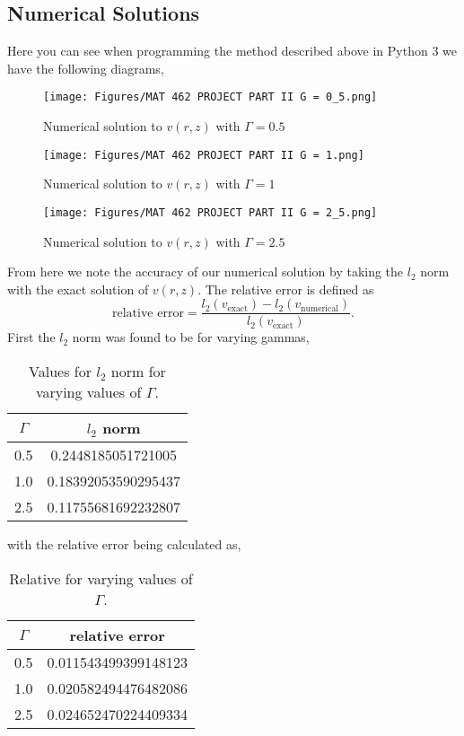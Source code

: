 \documentclass[11pt,letterpaper]{article}
\newcommand{\fpar}[1]{\left({#1}\right)} %
\begin{document}
\subsection{Numerical Solutions}
Here you can see when programming the method described above in Python 3 we have the following diagrams,
\begin{figure}[H]
  \texttt{[image: Figures/MAT 462 PROJECT PART II G = 0\_5.png]}
  \caption{Numerical solution to $v(r,z)$ with $\Gamma = 0.5 $}\label{fig:Gamma0.5}
\endminipage\hfill
{}
  \texttt{[image: Figures/MAT 462 PROJECT PART II G = 1.png]}
  \caption{Numerical solution to $v(r,z)$ with $\Gamma = 1 $}\label{fig:Gamma1}
\endminipage\hfill
{}%
  \texttt{[image: Figures/MAT 462 PROJECT PART II G = 2\_5.png]}
  \caption{Numerical solution to  $v(r,z)$ with $\Gamma = 2.5 $}\label{fig:Gamma2.5}
\endminipage
\end{figure}
From here we note the accuracy of our numerical solution by taking the $l_2$ norm with the exact solution of $v(r,z)$. The relative error is defined as
\begin{equation}\label{eq:Rel_Error}
       \text{relative error} = \dfrac{l_{2}\fpar{v_{\text{exact}}} - l_{2}\fpar{ v_{\text{numerical}}}}{l_{2}\fpar{v_{\text{exact}}}}.
\end{equation}
First the $l_2$ norm was found to be for varying gammas,
\begin{table}[H]
\centering
\begin{tabular}{|c|c|}
        \hline
        $\Gamma$ & $l_2$ norm\\
        \hline
        0.5 & 0.2448185051721005  \\
        \hline
        1.0 & 0.18392053590295437 \\
        \hline
        2.5 &  0.11755681692232807  \\
        \hline
        \end{tabular}
\caption{\label{tab:l2norm}Values for $l_2$ norm for varying values of $\Gamma$.}
\end{table}
with the relative error being calculated as,
\begin{table}[H]
\centering
\begin{tabular}{|c|c|}
        \hline
        $\Gamma$ & relative error \\
        \hline
        0.5 & 0.011543499399148123 \\
        \hline
        1.0 & 0.020582494476482086 \\
        \hline
        2.5 &  0.024652470224409334   \\
        \hline
        \end{tabular}
\caption{\label{tab:RelErrorPartII}Relative for varying values of $\Gamma$.}
\end{table}
\end{document}

